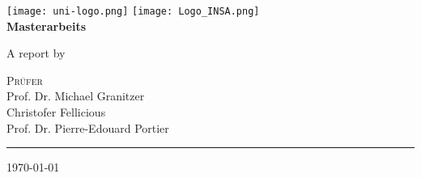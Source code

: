 \begin{titlepage}
    \centering
    \begin{onehalfspace}
    	
		\texttt{[image: uni-logo.png]}
		\hspace*{1.0cm}
		\texttt{[image: Logo\_INSA.png]}\\
		\vspace{1.0cm}
        	{\Large \bfseries Masterarbeits }\\

        	\vspace{2.5cm}

            \begin{doublespace}
            	{\textsf{\Huge{\thetitle}}}
            \end{doublespace}

        	\vspace{2cm}

            {\Large A report by}\\

        	\vspace{1cm}

        	{\bfseries \large{\theauthor}}

        	\vfill

        	{\Large
                \textsc{Pr\"ufer} \\
                Prof. Dr. Michael Granitzer\\
				Christofer Fellicious\\
				Prof. Dr. Pierre-Edouard Portier\\
        	}

        	\vspace{1.5cm}

        	\parbox{\linewidth}{\hrule\strut}

            \vfill

			{\large \today}
    \end{onehalfspace}
\end{titlepage}
